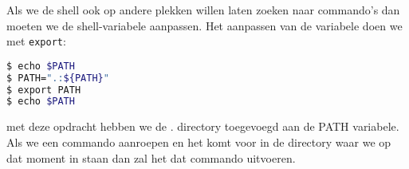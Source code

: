 Als we de shell ook op andere plekken willen laten zoeken naar commando's dan moeten we de shell-variabele aanpassen. Het aanpassen van de variabele doen we met \texttt{export}:
\begin{lstlisting}[language=bash]
$ echo $PATH
$ PATH=".:${PATH}"
$ export PATH
$ echo $PATH
\end{lstlisting}
met deze opdracht hebben we de . directory toegevoegd aan de PATH variabele. Als we een commando aanroepen en het komt voor in de directory waar we op dat moment in staan dan zal het dat commando uitvoeren.

